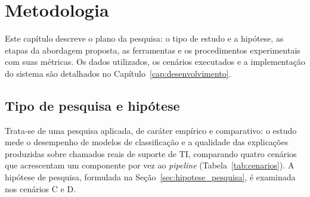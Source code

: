 \documentclass[
    12pt,                %
    openright,           %
    oneside,             %
    a4paper,             %
    english,             %
    brazil               %
]{abntex2}
\begin{document}
\vspace{0.5cm}

\begin{table}[htb]
    \centering
    \caption{Comparação entre trabalhos relacionados}
    \label{tab:trabalhos_relacionados}
    \vspace{0.2cm}
\end{table}

\chapter{Metodologia}
\label{cap:metodologia}
Este capítulo descreve o plano da pesquisa: o tipo de estudo e a hipótese, as etapas da abordagem proposta, as ferramentas e os procedimentos experimentais com suas métricas. Os dados utilizados, os cenários executados e a implementação do sistema são detalhados no Capítulo~\ref{cap:desenvolvimento}.

\section{Tipo de pesquisa e hipótese}
\label{sec:tipo_pesquisa}
Trata-se de uma pesquisa aplicada, de caráter empírico e comparativo: o estudo mede o desempenho 
de modelos de classificação e a qualidade das explicações produzidas sobre chamados reais de suporte de TI, 
comparando quatro cenários que acrescentam um componente por vez ao \textit{pipeline} (Tabela~\ref{tab:cenarios}). 
A hipótese de pesquisa, formulada na Seção~\ref{sec:hipotese_pesquisa}, é examinada nos cenários C e D.
\end{document}
